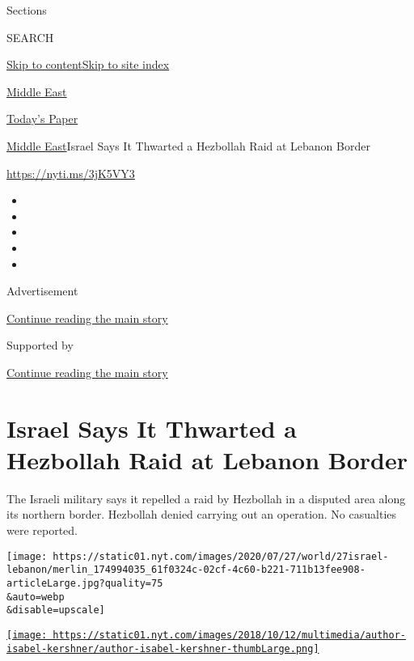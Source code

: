 Sections

SEARCH

\protect\hyperlink{site-content}{Skip to
content}\protect\hyperlink{site-index}{Skip to site index}

\href{https://www.nytimes.com/section/world/middleeast}{Middle East}

\href{https://myaccount.nytimes.com/auth/login?response_type=cookie\&client_id=vi}{}

\href{https://www.nytimes.com/section/todayspaper}{Today's Paper}

\href{/section/world/middleeast}{Middle East}\textbar{}Israel Says It
Thwarted a Hezbollah Raid at Lebanon Border

\url{https://nyti.ms/3jK5VY3}

\begin{itemize}
\item
\item
\item
\item
\item
\end{itemize}

Advertisement

\protect\hyperlink{after-top}{Continue reading the main story}

Supported by

\protect\hyperlink{after-sponsor}{Continue reading the main story}

\hypertarget{israel-says-it-thwarted-a-hezbollah-raid-at-lebanon-border}{%
\section{Israel Says It Thwarted a Hezbollah Raid at Lebanon
Border}\label{israel-says-it-thwarted-a-hezbollah-raid-at-lebanon-border}}

The Israeli military says it repelled a raid by Hezbollah in a disputed
area along its northern border. Hezbollah denied carrying out an
operation. No casualties were reported.

\texttt{[image: https://static01.nyt.com/images/2020/07/27/world/27israel-lebanon/merlin\_174994035\_61f0324c-02cf-4c60-b221-711b13fee908-articleLarge.jpg?quality=75\\\&auto=webp\\\&disable=upscale]}

\href{https://www.nytimes.com/by/isabel-kershner}{\texttt{[image: https://static01.nyt.com/images/2018/10/12/multimedia/author-isabel-kershner/author-isabel-kershner-thumbLarge.png]}}

